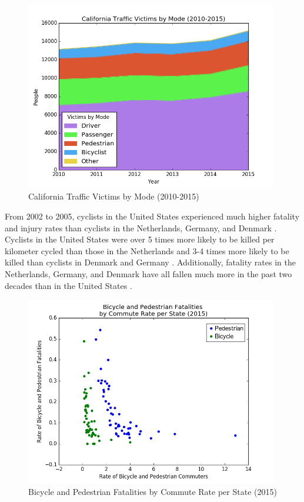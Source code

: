 \documentclass{article}
\begin{document}
\begin{figure}[p]
    \centering
    \includegraphics[width=11cm]{victimsbymode}
    \caption{California Traffic Victims by Mode (2010-2015)}
    \label{fig:victimsbymode}
\end{figure}

From 2002 to 2005, cyclists in the United States experienced much higher fatality and injury rates than cyclists in the Netherlands, Germany, and Denmark \citep[Page 1512]{pucher2003}. Cyclists in the United States were over 5 times more likely to be killed per kilometer cycled than those in the Netherlands and 3-4 times more likely to be killed than cyclists in Denmark and Germany \citep[Page 12]{pucher2008}. Additionally, fatality rates in the Netherlands, Germany, and Denmark have all fallen much more in the past two decades than in the United States \citep[Page 283]{buehler2017}.

 \begin{figure}
    \centering
    \includegraphics[width=11cm]{usrates}
    \caption{Bicycle and Pedestrian Fatalities by Commute Rate per State (2015)}
    \label{fig:usrates}
\end{figure}
\end{document}
